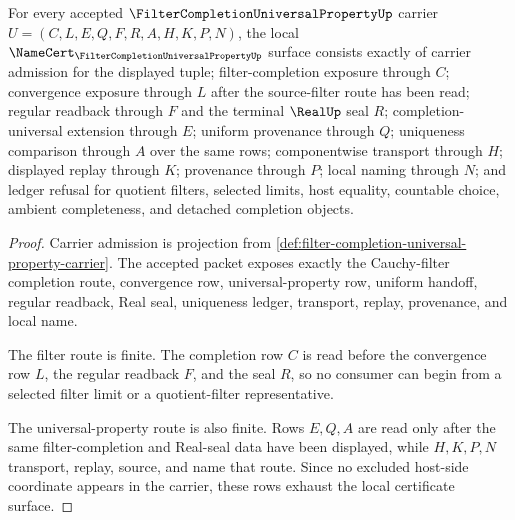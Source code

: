\begin{theorem}
\label{thm:filter-completion-universal-property-namecert-obligations}
For every accepted $\FilterCompletionUniversalPropertyUp$ carrier $U=(C,L,E,Q,F,R,A,H,K,P,N)$, the local $\NameCert_{\FilterCompletionUniversalPropertyUp}$ surface consists exactly of carrier admission for the displayed tuple; filter-completion exposure through $C$; convergence exposure through $L$ after the source-filter route has been read; regular readback through $F$ and the terminal $\RealUp$ seal $R$; completion-universal extension through $E$; uniform provenance through $Q$; uniqueness comparison through $A$ over the same rows; componentwise transport through $H$; displayed replay through $K$; provenance through $P$; local naming through $N$; and ledger refusal for quotient filters, selected limits, host equality, countable choice, ambient completeness, and detached completion objects.
\end{theorem}
\begin{proof}
Carrier admission is projection from \autoref{def:filter-completion-universal-property-carrier}. The accepted packet exposes exactly the Cauchy-filter completion route, convergence row, universal-property row, uniform handoff, regular readback, Real seal, uniqueness ledger, transport, replay, provenance, and local name.

The filter route is finite. The completion row $C$ is read before the convergence row $L$, the regular readback $F$, and the seal $R$, so no consumer can begin from a selected filter limit or a quotient-filter representative.

The universal-property route is also finite. Rows $E,Q,A$ are read only after the same filter-completion and Real-seal data have been displayed, while $H,K,P,N$ transport, replay, source, and name that route. Since no excluded host-side coordinate appears in the carrier, these rows exhaust the local certificate surface.
\end{proof}

